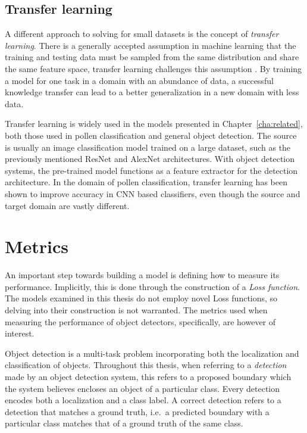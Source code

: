 \subsection{Transfer learning}
A different approach to solving for small datasets is the concept of \textit{transfer learning}.
There is a generally accepted assumption in machine learning that the training and testing data must be sampled from the same distribution and share the same feature space, transfer learning challenges this assumption \parencite{pan_yang_2010}.
By training a model for one task in a domain with an abundance of data, a successful knowledge transfer can lead to a better generalization in a new domain with less data.

Transfer learning is widely used in the models presented in Chapter~\ref{cha:related}, both those used in pollen classification and general object detection.
The source is usually an image classification model trained on a large dataset, such as the previously mentioned ResNet and AlexNet architectures.
With object detection systems, the pre-trained model functions as a feature extractor for the detection architecture.
In the domain of pollen classification, transfer learning has been shown to improve accuracy in CNN based classifiers, even though the source and target domain are vastly different.

\section{Metrics}\label{sec:back-metrics}
An important step towards building a model is defining how to measure its performance.
Implicitly, this is done through the construction of a \textit{Loss function}.
The models examined in this thesis do not employ novel Loss functions, so delving into their construction is not warranted.
The metrics used when measuring the performance of object detectors, specifically, are however of interest.

Object detection is a multi-task problem incorporating both the localization and classification of objects.
Throughout this thesis, when referring to a \textit{detection} made by an object detection system, this refers to a proposed boundary which the system believes encloses an object of a particular class.
Every detection encodes both a localization and a class label.
A correct detection refers to a detection that matches a ground truth, i.e.\ a predicted boundary with a particular class matches that of a ground truth of the same class.


